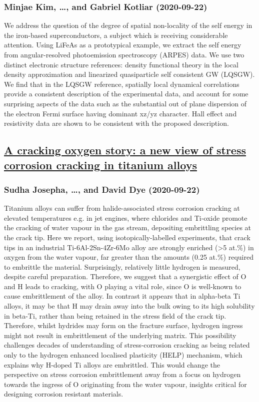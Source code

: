 {\subsubsection*{Minjae Kim, \dots, and Gabriel Kotliar (2020-09-22)}
We address the question of the degree of spatial non-locality of the self
energy in the iron-based superconductors, a subject which is receiving
considerable attention. Using LiFeAs as a prototypical example, we extract the
self energy from angular-resolved photoemission spectroscopy (ARPES) data. We
use two distinct electronic structure references: density functional theory in
the local density approximation and linearized quasiparticle self consistent GW
(LQSGW). We find that in the LQSGW reference, spatially local dynamical
correlations provide a consistent description of the experimental data, and
account for some surprising aspects of the data such as the substantial out of
plane dispersion of the electron Fermi surface having dominant xz/yz character.
Hall effect and resistivity data are shown to be consistent with the proposed
description.

\subsection*{\href{http://arxiv.org/abs/2009.10567v1}{A cracking oxygen story: a new view of stress corrosion cracking in  titanium alloys}}
\subsubsection*{Sudha Josepha, \dots, and David Dye (2020-09-22)}
Titanium alloys can suffer from halide-associated stress corrosion cracking
at elevated temperatures e.g. in jet engines, where chlorides and Ti-oxide
promote the cracking of water vapour in the gas stream, depositing embrittling
species at the crack tip. Here we report, using isotopically-labelled
experiments, that crack tips in an industrial Ti-6Al-2Sn-4Zr-6Mo alloy are
strongly enriched (>5 at.\%) in oxygen from the water vapour, far greater than
the amounts (0.25 at.\%) required to embrittle the material. Surprisingly,
relatively little hydrogen is measured, despite careful preparation. Therefore,
we suggest that a synergistic effect of O and H leads to cracking, with O
playing a vital role, since O is well-known to cause embrittlement of the
alloy. In contrast it appears that in alpha-beta Ti alloys, it may be that H
may drain away into the bulk owing to its high solubility in beta-Ti, rather
than being retained in the stress field of the crack tip. Therefore, whilst
hydrides may form on the fracture surface, hydrogen ingress might not result in
embrittlement of the underlying matrix. This possibility challenges decades of
understanding of stress-corrosion cracking as being related only to the
hydrogen enhanced localised plasticity (HELP) mechanism, which explains why
H-doped Ti alloys are embrittled. This would change the perspective on stress
corrosion embrittlement away from a focus on hydrogen towards the ingress of O
originating from the water vapour, insights critical for designing corrosion
resistant materials.

}
